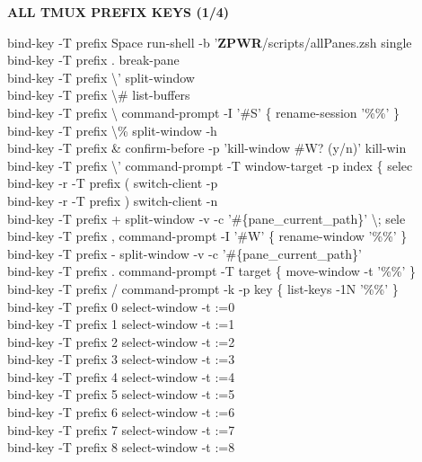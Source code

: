 \documentclass[11pt,a4paper,twoside]{book}
\begin{document}
\vspace{10pt}
{\large\bfseries\color{neoncyan} ALL TMUX PREFIX KEYS (1/4)}\vspace{6pt}

bind-key  -T prefix  Space  run-shell -b '\textbf{ZPWR}/scripts/allPanes.zsh single\\
bind-key  -T prefix  .  break-pane\\
bind-key  -T prefix  \textbackslash{}'  split-window\\
bind-key  -T prefix  \textbackslash{}\#  list-buffers\\
bind-key  -T prefix  \textbackslash{}  command-prompt -I '\#S' \{ rename-session '\%\%' \}\\
bind-key  -T prefix  \textbackslash{}\%  split-window -h\\
bind-key  -T prefix  \&  confirm-before -p 'kill-window \#W? (y/n)' kill-win\\
bind-key  -T prefix  \textbackslash{}'  command-prompt -T window-target -p index \{ selec\\
bind-key -r -T prefix  (  switch-client -p\\
bind-key -r -T prefix  )  switch-client -n\\
bind-key  -T prefix  +  split-window -v -c '\#\{pane\_current\_path\}' \textbackslash{}; sele\\
bind-key  -T prefix  ,  command-prompt -I '\#W' \{ rename-window '\%\%' \}\\
bind-key  -T prefix  -  split-window -v -c '\#\{pane\_current\_path\}'\\
bind-key  -T prefix  .  command-prompt -T target \{ move-window -t '\%\%' \}\\
bind-key  -T prefix  /  command-prompt -k -p key \{ list-keys -1N '\%\%' \}\\
bind-key  -T prefix  0  select-window -t :=0\\
bind-key  -T prefix  1  select-window -t :=1\\
bind-key  -T prefix  2  select-window -t :=2\\
bind-key  -T prefix  3  select-window -t :=3\\
bind-key  -T prefix  4  select-window -t :=4\\
bind-key  -T prefix  5  select-window -t :=5\\
bind-key  -T prefix  6  select-window -t :=6\\
bind-key  -T prefix  7  select-window -t :=7\\
bind-key  -T prefix  8  select-window -t :=8\\
\end{document}
